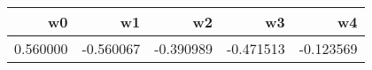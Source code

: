 \begin{tabular}{rrrrr}
\toprule
w0 & w1 & w2 & w3 & w4 \\
\midrule
0.560000 & -0.560067 & -0.390989 & -0.471513 & -0.123569 \\
\bottomrule
\end{tabular}
